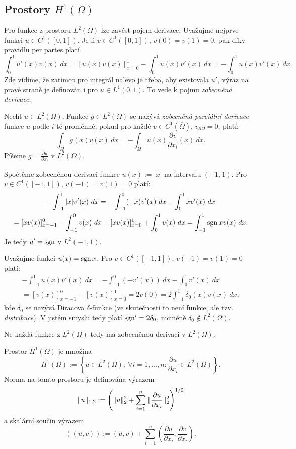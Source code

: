 \subsection{Prostory $H^1(\Omega)$}

Pro funkce z prostoru $L^2(\Omega)$ lze zavést pojem derivace.
Uvažujme nejprve funkci $u\in C^1([0,1])$.
Je-li $v\in C^1([0,1])$, $v(0)=v(1)=0$, pak díky pravidlu per partes platí
\[ \int_0^1 u'(x)v(x)~dx = [u(x)v(x)]_{x=0}^1 - \int_0^1u(x)v'(x)~dx = - \int_0^1u(x)v'(x)~dx. \]
Zde vidíme, že zatímco pro integrál nalevo je třeba, aby existovala $u'$, výraz na pravé straně je definován i pro $u\in L^1(0,1)$. To vede k pojmu \emph{zobecněná derivace}.
\begin{df}
Nechť $u\in L^2(\Omega)$. Funkce $g\in L^2(\Omega)$ se nazývá \emph{zobecněná parciální derivace} funkce $u$ podle $i$-té proměnné, pokud pro každé $v\in C^1(\overline\Omega)$, $v_{\partial\Omega}=0$, platí:
\[ \int_\Omega g(x)v(x)~dx = -\int_{\Omega} u(x)\frac{\partial v}{\partial x_i}(x)~dx. \]
Píšeme $g=\frac{\partial u}{\partial x_i}$ v $L^2(\Omega)$.
\end{df}
\begin{ex}
Spočtěme zobecněnou derivaci funkce $u(x):=|x|$ na intervalu $(-1,1)$.
Pro $v\in C^1([-1,1])$, $v(-1)=v(1)=0$ platí:
\begin{multline*}
-\int_{-1}^1|x|v'(x)~dx = -\int_{-1}^0(-x)v'(x)~dx - \int_0^1xv'(x)~dx\\
= [xv(x)]_{x=-1}^0 - \int_{-1}^0v(x)~dx - [xv(x)]_{x=0}^1 + \int_0^1v(x)~dx
= \int_{-1}^1\operatorname{sgn} x v(x)~dx.
\end{multline*}
Je tedy $u'=\operatorname{sgn}$ v $L^2(-1,1)$.
\end{ex}
\begin{ex}
Uvažujme funkci $u(x) = \operatorname{sgn} x$. Pro $v\in C^1([-1,1])$, $v(-1)=v(1)=0$ platí:
\begin{multline*}
 -\int_{-1}^1u(x)v'(x)~dx = -\int_{-1}^0 (-v'(x))~dx - \int_0^1 v'(x)~dx\\
 = [v(x)]_{x=-1}^0 - [v(x)]_{x=0}^1 = 2v(0) = 2\int_{-1}^1\delta_0(x)v(x)~dx,
\end{multline*}
kde $\delta_0$ se nazývá Diracova $\delta$-funkce (ve skutečnosti to není funkce, ale tzv. \emph{distribuce}). V jistém smyslu tedy platí $\operatorname{sgn}'=2\delta_0$, nicméně $\delta_0\notin L^2(\Omega)$.
\end{ex}
Ne každá funkce z $L^2(\Omega)$ tedy má zobecněnou derivaci v $L^2(\Omega)$.
\begin{df}
Prostor $H^1(\Omega)$ je množina
\[ H^1(\Omega):=\left\{u\in L^2(\Omega);~\forall i=1,\ldots,n:\frac{\partial u}{\partial x_i}\in L^2(\Omega)\right\}. \]
Norma na tomto prostoru je definována výrazem
\[ \|u\|_{1,2} := \left(\|u\|_2^2 + \sum_{i=1}^n\|\frac{\partial u}{\partial x_i}\|_2^2\right)^{1/2} \]
a skalární součin výrazem
\[ ((u,v)):=(u,v) + \sum_{i=1}^n(\frac{\partial u}{\partial x_i},\frac{\partial v}{\partial x_i}). \]
\end{df}

